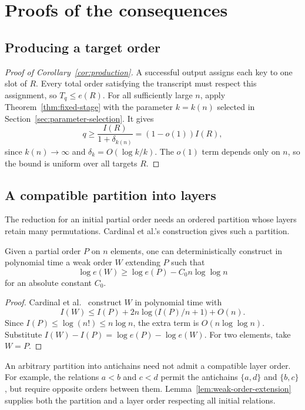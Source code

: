 \section{Proofs of the consequences}\label{app:consequences}

\subsection{Producing a target order}

\begin{proof}[Proof of Corollary~\ref{cor:production}]
A successful output assigns each key to one slot of $R$. Every total
order satisfying the transcript must respect this assignment, so
$T_q\le e(R)$. For all sufficiently large $n$, apply
Theorem~\ref{thm:fixed-stage} with the parameter $k=k(n)$ selected in
Section~\ref{sec:parameter-selection}. It gives
\[
q\ge\frac{I(R)}{1+\delta_{k(n)}}=(1-o(1))I(R),
\]
since $k(n)\to\infty$ and $\delta_k=O(\log k/k)$. The $o(1)$ term
depends only on $n$, so the bound is uniform over all targets $R$.
\end{proof}

\subsection{A compatible partition into layers}

The reduction for an initial partial order needs an ordered partition
whose layers retain many permutations. Cardinal et al.'s construction gives such a partition.

\begin{lemma}\label{lem:weak-order-extension}
Given a partial order $P$ on $n$ elements, one can deterministically
construct in polynomial time a weak order $W$ extending $P$ such that
\[
\log e(W)\ge\log e(P)-C_0 n\log\log n
\]
for an absolute constant $C_0$.
\end{lemma}
\begin{proof}
Cardinal et al.~\cite[Section~3, Lemmas~1 and~3]{cardinal-production}
construct $W$ in polynomial time with
\[
I(W)\le I(P)+2n\log\bigl(I(P)/n+1\bigr)+O(n).
\]
Since $I(P)\le\log(n!)\le n\log n$, the extra term is
$O(n\log\log n)$. Substitute
$I(W)-I(P)=\log e(P)-\log e(W)$.
For two elements, take $W=P$.
\end{proof}

An arbitrary partition into antichains need not admit a compatible layer
order. For example, the relations $a<b$ and $c<d$ permit the antichains
$\{a,d\}$ and $\{b,c\}$, but require opposite orders between them.
Lemma~\ref{lem:weak-order-extension} supplies both the partition and a
layer order respecting all initial relations.

